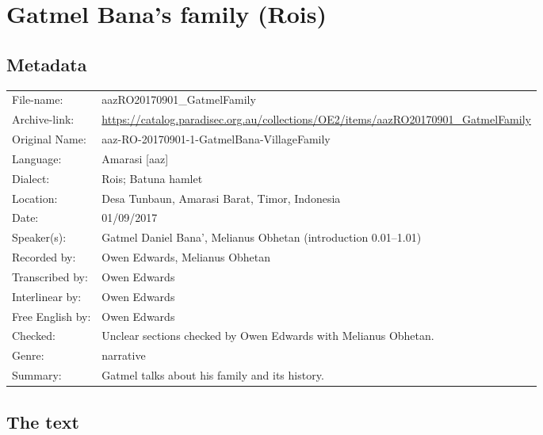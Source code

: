 \section{Gatmel Bana's family (Ro{\Q}is)}\label{sec:GatBanFam}
\subsection{Metadata}

\wg\begin{tabular}{lL{.67\textwidth}}
File-name:					& aazRO20170901{\_}GatmelFamily\\
Archive-link:				& \url{https://catalog.paradisec.org.au/collections/OE2/items/aazRO20170901_GatmelFamily} \\
Original Name:			& aaz-RO-20170901-1-GatmelBana-VillageFamily\\
Language:						& Amarasi [aaz] \\
Dialect:						& Ro{\Q}is; Batuna hamlet \\
Location:						& Desa Tunbaun, Amarasi Barat, Timor, Indonesia\\
Date:								&	01/09/2017\\
Speaker(s):					& Gatmel Daniel Bana', Melianus Obhetan (introduction 0.01--1.01)\\
Recorded by: 				& Owen Edwards, Melianus Obhetan\\
Transcribed by:			& Owen Edwards\\
Interlinear by:			& Owen Edwards \\
Free English by:		& Owen Edwards\\
Checked:						& Unclear sections checked by Owen Edwards with Melianus Obhetan. \\
Genre:							& narrative\\
Summary:						& Gatmel talks about his family and its history.\\
\end{tabular}


\renewcommand{\N}{\tsc{3psr;sg.psm}}
\newcommand{\R}{\tsc{3psr;pl.psm}}
\subsection{The text}

